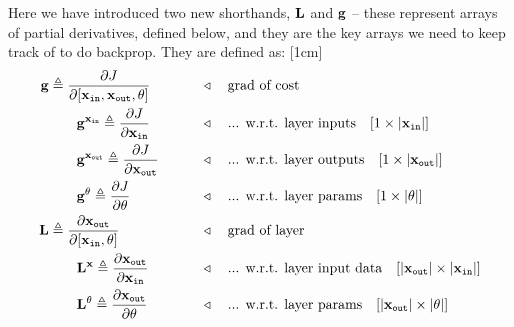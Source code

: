 Here we have introduced two new shorthands, $\mathbf{L}$ and $\mathbf{g}$ -- these represent arrays of partial derivatives, defined below, and they are the key arrays we need to keep track of to do backprop. They are defined as:
[1cm]
\begin{align}
    \mathbf{g} &\triangleq \frac{\partial J}{\partial [\mathbf{x}_{\texttt{in}}, \mathbf{x}_{\texttt{out}}, \theta]} &&\quad\quad \triangleleft \quad \text{grad of cost}\\
     &\quad\quad \mathbf{g}^{\mathbf{x}_{\texttt{in}}} \triangleq \frac{\partial J}{\partial \mathbf{x}_{\texttt{in}}} &&\quad\quad \triangleleft \quad \text{... w.r.t. layer inputs} \quad [1 \times |\mathbf{x}_{\texttt{in}}|]\\
     &\quad\quad \mathbf{g}^{\mathbf{x}_{\texttt{out}}} \triangleq \frac{\partial J}{\partial \mathbf{x}_{\texttt{out}}} &&\quad\quad \triangleleft \quad \text{... w.r.t. layer outputs} \quad [1 \times |\mathbf{x}_{\texttt{out}}|]\\
     &\quad\quad \mathbf{g}^{\theta} \triangleq \frac{\partial J}{\partial \theta} &&\quad\quad \triangleleft \quad \text{... w.r.t. layer params} \quad [1 \times |\theta|]\\
    \mathbf{L} &\triangleq \frac{\partial \mathbf{x}_{\texttt{out}}}{\partial [\mathbf{x}_{\texttt{in}}, \theta]} &&\quad\quad \triangleleft \quad \text{grad of layer}\\
    &\quad\quad \mathbf{L}^{\mathbf{x}} \triangleq \frac{\partial \mathbf{x}_{\texttt{out}}}{\partial \mathbf{x}_{\texttt{in}}} &&\quad\quad \triangleleft \quad \text{... w.r.t. layer input data} \quad [|\mathbf{x}_{\texttt{out}}| \times |\mathbf{x}_{\texttt{in}}|]\\
    &\quad\quad \mathbf{L}^{\theta} \triangleq \frac{\partial \mathbf{x}_{\texttt{out}}}{\partial \theta} &&\quad\quad \triangleleft \quad \text{... w.r.t. layer params} \quad [|\mathbf{x}_{\texttt{out}}| \times |\theta|]
\end{align}

